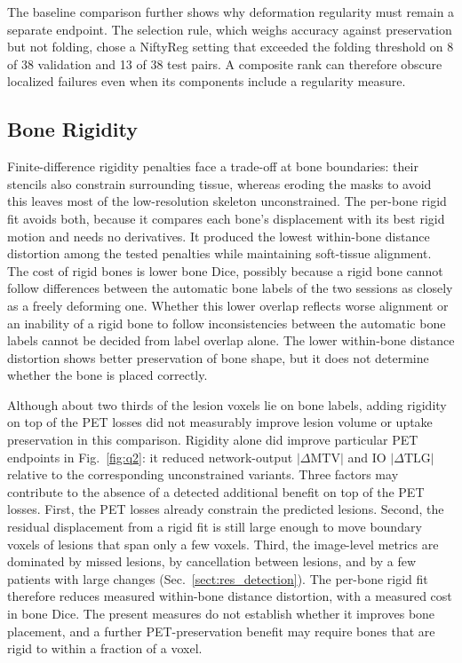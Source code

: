 The baseline comparison further shows why deformation regularity must remain a separate endpoint.
The selection rule, which weighs accuracy against preservation but not folding, chose a NiftyReg setting that exceeded the folding threshold on 8 of 38 validation and 13 of 38 test pairs.
A composite rank can therefore obscure localized failures even when its components include a regularity measure.

\subsection{Bone Rigidity}
Finite-difference rigidity penalties face a trade-off at bone boundaries: their stencils also constrain surrounding tissue, whereas eroding the masks to avoid this leaves most of the low-resolution skeleton unconstrained.
The per-bone rigid fit avoids both, because it compares each bone's displacement with its best rigid motion and needs no derivatives.
It produced the lowest within-bone distance distortion among the tested penalties while maintaining soft-tissue alignment.
The cost of rigid bones is lower bone Dice, possibly because a rigid bone cannot follow differences between the automatic bone labels of the two sessions as closely as a freely deforming one.
Whether this lower overlap reflects worse alignment or an inability of a rigid bone to follow inconsistencies between the automatic bone labels cannot be decided from label overlap alone.
The lower within-bone distance distortion shows better preservation of bone shape, but it does not determine whether the bone is placed correctly.

Although about two thirds of the lesion voxels lie on bone labels, adding rigidity on top of the PET losses did not measurably improve lesion volume or uptake preservation in this comparison.
Rigidity alone did improve particular PET endpoints in Fig.~\ref{fig:q2}: it reduced network-output $|\Delta\mathrm{MTV}|$ and IO $|\Delta\mathrm{TLG}|$ relative to the corresponding unconstrained variants.
Three factors may contribute to the absence of a detected additional benefit on top of the PET losses.
First, the PET losses already constrain the predicted lesions.
Second, the residual displacement from a rigid fit is still large enough to move boundary voxels of lesions that span only a few voxels.
Third, the image-level metrics are dominated by missed lesions, by cancellation between lesions, and by a few patients with large changes (Sec.~\ref{sect:res_detection}).
The per-bone rigid fit therefore reduces measured within-bone distance distortion, with a measured cost in bone Dice.
The present measures do not establish whether it improves bone placement, and a further PET-preservation benefit may require bones that are rigid to within a fraction of a voxel.

